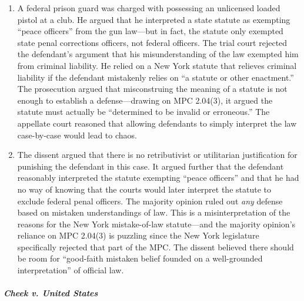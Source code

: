 \begin{enumerate}
    \item A federal prison guard was charged with possessing an unlicensed loaded pistol at a club. He argued that he interpreted a state statute as exempting ``peace officers'' from the gun law---but in fact, the statute only exempted state penal corrections officers, not federal officers. The trial court rejected the defendant's argument that his misunderstanding of the law exempted him from criminal liability. He relied on a New York statute that relieves criminal liability if the defendant mistakenly relies on ``a statute or other enactment.'' The prosecution argued that misconstruing the meaning of a statute is not enough to establish a defense---drawing on MPC 2.04(3), it argued the statute must actually be ``determined to be invalid or erroneous.'' The appellate court reasoned that allowing defendants to simply interpret the law case-by-case would lead to chaos.
    \item The dissent argued that there is no retributivist or utilitarian justification for punishing the defendant in this case. It argued further that the defendant reasonably interpreted the statute exempting ``peace officers'' and that he had no way of knowing that the courts would later interpret the statute to exclude federal penal officers. The majority opinion ruled out \emph{any} defense based on mistaken understandings of law. This is a misinterpretation of the reasons for the New York mistake-of-law statute---and the majority opinion's reliance on MPC 2.04(3) is puzzling since the New York legislature specifically rejected that part of the MPC. The dissent believed there should be room for ``good-faith mistaken belief founded on a well-grounded interpretation'' of official law.
\end{enumerate}

\paragraph{\emph{Cheek v. United States}}

